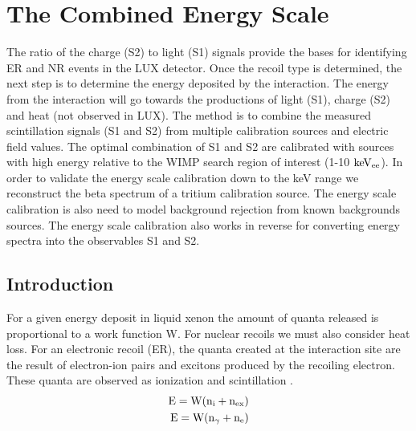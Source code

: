 \renewcommand{\thechapter}{4}

\chapter{The Combined Energy Scale}
\label{Ch:E_Scale_Cal}

The ratio of the charge (S2) to light (S1) signals provide the bases for identifying ER and NR events in the LUX detector. Once the recoil type is determined, the next step is to determine the energy deposited by the interaction. The energy from the interaction will go towards the productions of light (S1), charge (S2) and heat (not observed in LUX). The method is to combine the measured scintillation signals (S1 and S2) from multiple calibration sources and electric field values. The optimal combination of S1 and S2 are calibrated with sources with high energy relative to the WIMP search region of interest (1-10 $\rm keV_{ee}$). In order to validate the energy scale calibration down to the keV range we reconstruct the beta spectrum of a tritium calibration source. The energy scale calibration is also need to model background rejection from known backgrounds sources. The energy scale calibration also works in reverse for converting energy spectra into the observables S1 and S2.

\section{Introduction}
For a given energy deposit in liquid xenon the amount of quanta released is proportional to a work function W. For nuclear recoils we must also consider heat loss. For an electronic recoil (ER), the quanta created at the interaction site are the result of electron-ion pairs and excitons produced by the recoiling electron. These quanta are observed as ionization and scintillation \cite{Platzman}.
\begin{equation}
\begin{split}
\rm E= W (n_i + n_{ex}) \\
\rm E= W (n_\gamma + n_e)  \\
\label{eq:E_Q_ER}
\end{split}
\end{equation}

